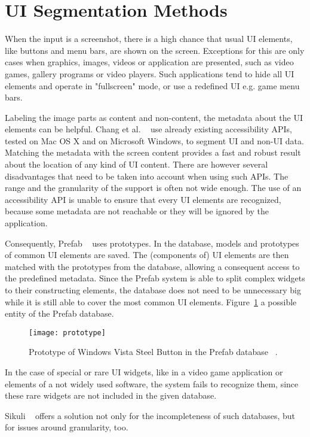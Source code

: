 \documentclass[draft,final]{vutinfth} %
\begin{document}
	\section{UI Segmentation Methods}
	When the input is a screenshot, there is a high chance that usual UI elements, like buttons and menu bars, are shown on the screen.
	Exceptions for this are only cases when graphics, images, videos or application are presented, such as video games, gallery programs or video players.
	Such applications tend to hide all UI elements and operate in "fullscreen" mode, or use a redefined UI e.g. game menu bars.\par
	Labeling the image parts as content and non-content, the metadata about the UI elements can be helpful.
	Chang et al. ~\cite{chang2011associating} use already existing accessibility APIs, tested on Mac OS X and on Microsoft Windows, to segment UI and non-UI data. 
	Matching the metadata with the screen content provides a fast and robust result about the location of any kind of UI content.
	There are however several disadvantages that need to be taken into account when using such APIs.
	The range and the granularity of the support is often not wide enough.
	The use of an accessibility API is unable to ensure that every UI elements are recognized, because some metadata are not reachable or they will be ignored by the application.\par
	Consequently, Prefab ~\cite{dixon2010prefab} uses prototypes. 
	In the database, models and  prototypes of common UI elements are saved.
	The (components of) UI elements are then matched with the prototypes from the database, allowing a consequent access to the predefined metadata.
	Since the Prefab system is able to split complex widgets to their constructing elements, the database does not need to be unnecessary big while it is still able to cover the most common UI elements.
	Figure~\ref{fig:prototype} a possible entity of the Prefab database.
	\begin{figure}[H]
		\centering		
		\texttt{[image: prototype]}
		\caption{Prototype of Windows Vista Steel Button in the Prefab database ~\cite{dixon2010prefab}.}
		\label{fig:prototype}
	\end{figure} 
	In the case of special or rare UI widgets, like in a video game application or elements of a not widely used software, the system fails to recognize them, since these rare widgets are not included in the given database.\par
	Sikuli ~\cite{yeh2009sikuli} offers a solution not only for the incompleteness of such databases, but for issues around granularity, too.
\end{document}
